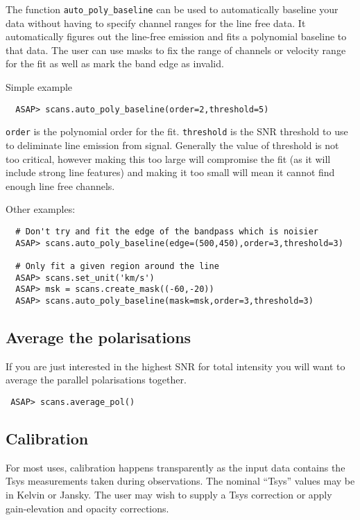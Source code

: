 \documentclass[11pt]{article}
\newcommand{\cmd}[1]{{\tt #1}}
\begin{document}
The function \cmd{auto\_poly\_baseline} can be used to automatically
baseline your data without having to specify channel ranges for the
line free data. It automatically figures out the line-free emission
and fits a polynomial baseline to that data. The user can use masks to
fix the range of channels or velocity range for the fit as well as
mark the band edge as invalid.

Simple example

\begin{verbatim}
  ASAP> scans.auto_poly_baseline(order=2,threshold=5)
\end{verbatim}

\cmd{order} is the polynomial order for the fit. \cmd{threshold} is
the SNR threshold to use to deliminate line emission from
signal. Generally the value of threshold is not too critical, however
making this too large will compromise the fit (as it will include
strong line features) and making it too small will mean it cannot find
enough line free channels.


Other examples:

\begin{verbatim}
  # Don't try and fit the edge of the bandpass which is noisier
  ASAP> scans.auto_poly_baseline(edge=(500,450),order=3,threshold=3)

  # Only fit a given region around the line
  ASAP> scans.set_unit('km/s')
  ASAP> msk = scans.create_mask((-60,-20))
  ASAP> scans.auto_poly_baseline(mask=msk,order=3,threshold=3)

\end{verbatim}

\subsection{Average the polarisations}

If you are just interested in the highest SNR for total intensity you
will want to average the parallel polarisations together.

\begin{verbatim}
 ASAP> scans.average_pol()
\end{verbatim}

\subsection{Calibration}

For most uses, calibration happens transparently as the input data
contains the Tsys measurements taken during observations. The nominal
``Tsys'' values may be in Kelvin or Jansky. The user may wish to
supply a Tsys correction or apply gain-elevation and opacity
corrections.
\end{document}

